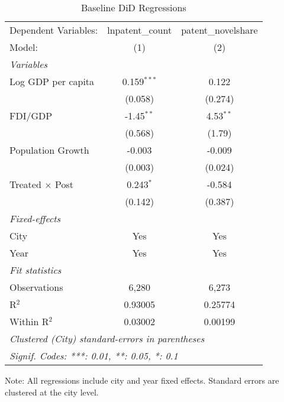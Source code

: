 \documentclass[12pt]{article}
\begin{document}
\bigskip\begin{table}[htbp]
   \caption{Baseline DiD Regressions}
   \centering
   \begin{tabular}{lcc}
      \tabularnewline \midrule \midrule
      Dependent Variables: & lnpatent\_count  & patent\_novelshare\\   
      Model:               & (1)              & (2)\\  
      \midrule
      \emph{Variables}\\
      Log GDP per capita   & 0.159$^{***}$    & 0.122\\   
                           & (0.058)          & (0.274)\\   
      FDI/GDP              & -1.45$^{**}$     & 4.53$^{**}$\\   
                           & (0.568)          & (1.79)\\   
      Population Growth    & -0.003           & -0.009\\   
                           & (0.003)          & (0.024)\\   
      Treated × Post       & 0.243$^{*}$      & -0.584\\   
                           & (0.142)          & (0.387)\\   
      \midrule
      \emph{Fixed-effects}\\
      City                 & Yes              & Yes\\  
      Year                 & Yes              & Yes\\  
      \midrule
      \emph{Fit statistics}\\
      Observations         & 6,280            & 6,273\\  
      R$^2$                & 0.93005          & 0.25774\\  
      Within R$^2$         & 0.03002          & 0.00199\\  
      \midrule \midrule
      \multicolumn{3}{l}{\emph{Clustered (City) standard-errors in parentheses}}\\
      \multicolumn{3}{l}{\emph{Signif. Codes: ***: 0.01, **: 0.05, *: 0.1}}\\
   \end{tabular}
   
   \par \raggedright 
   Note: All regressions include city and year fixed effects. Standard errors are clustered at the city level.
\end{table}
\bigskip%
\end{document}
